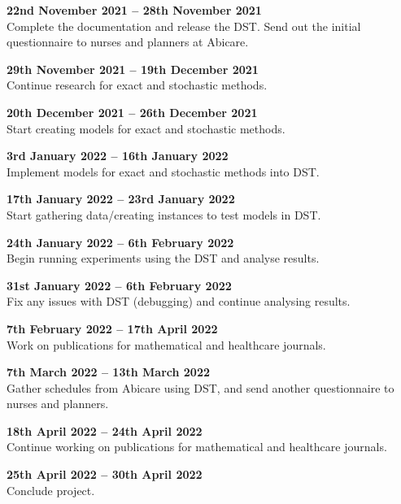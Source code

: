 \documentclass[a4paper]{article}
\begin{document}
\textbf{22nd November 2021 -- 28th November 2021}\\
Complete the documentation and release the DST. Send out the initial questionnaire to nurses and planners at Abicare.

\textbf{29th November 2021 -- 19th December 2021}\\
Continue research for exact and stochastic methods.

\textbf{20th December 2021 -- 26th December 2021}\\
Start creating models for exact and stochastic methods.

\textbf{3rd January 2022 -- 16th January 2022}\\
Implement models for exact and stochastic methods into DST.

\textbf{17th January 2022 -- 23rd January 2022}\\
Start gathering data/creating instances to test models in DST.

\textbf{24th January 2022 -- 6th February 2022}\\
Begin running experiments using the DST and analyse results.

\textbf{31st January 2022 -- 6th February 2022}\\
Fix any issues with DST (debugging) and continue analysing results.

\textbf{7th February 2022 -- 17th April 2022}\\
Work on publications for mathematical and healthcare journals.

\textbf{7th March 2022 -- 13th March 2022}\\
Gather schedules from Abicare using DST, and send another questionnaire to nurses and planners.

\textbf{18th April 2022 -- 24th April 2022}\\
Continue working on publications for mathematical and healthcare journals.

\textbf{25th April 2022 -- 30th April 2022}\\
Conclude project.
\end{document}
